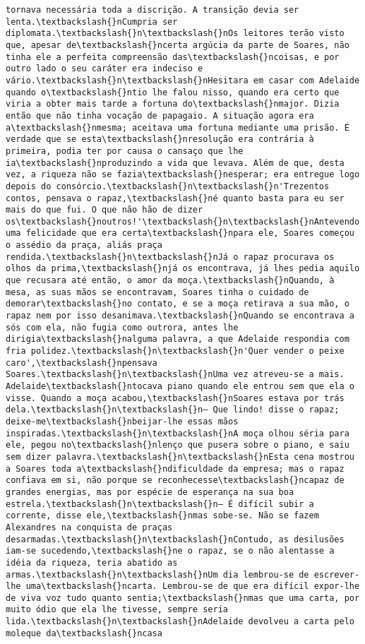 \documentclass[11pt]{article}
\begin{document}
\begin{Verbatim}[commandchars=\\\{\}]
tornava necessária toda a discrição. A transição devia ser lenta.\textbackslash{}nCumpria ser diplomata.\textbackslash{}n\textbackslash{}nOs leitores terão visto que, apesar de\textbackslash{}ncerta argúcia da parte de Soares, não tinha ele a perfeita compreensão das\textbackslash{}ncoisas, e por outro lado o seu caráter era indeciso e vário.\textbackslash{}n\textbackslash{}nHesitara em casar com Adelaide quando o\textbackslash{}ntio lhe falou nisso, quando era certo que viria a obter mais tarde a fortuna do\textbackslash{}nmajor. Dizia então que não tinha vocação de papagaio. A situação agora era a\textbackslash{}nmesma; aceitava uma fortuna mediante uma prisão. É verdade que se esta\textbackslash{}nresolução era contrária à primeira, podia ter por causa o cansaço que lhe ia\textbackslash{}nproduzindo a vida que levava. Além de que, desta vez, a riqueza não se fazia\textbackslash{}nesperar; era entregue logo depois do consórcio.\textbackslash{}n\textbackslash{}n'Trezentos contos, pensava o rapaz,\textbackslash{}né quanto basta para eu ser mais do que fui. O que não hão de dizer os\textbackslash{}noutros!'\textbackslash{}n\textbackslash{}nAntevendo uma felicidade que era certa\textbackslash{}npara ele, Soares começou o assédio da praça, aliás praça rendida.\textbackslash{}n\textbackslash{}nJá o rapaz procurava os olhos da prima,\textbackslash{}njá os encontrava, já lhes pedia aquilo que recusara até então, o amor da moça.\textbackslash{}nQuando, à mesa, as suas mãos se encontravam, Soares tinha o cuidado de demorar\textbackslash{}no contato, e se a moça retirava a sua mão, o rapaz nem por isso desanimava.\textbackslash{}nQuando se encontrava a sós com ela, não fugia como outrora, antes lhe dirigia\textbackslash{}nalguma palavra, a que Adelaide respondia com fria polidez.\textbackslash{}n\textbackslash{}n'Quer vender o peixe caro',\textbackslash{}npensava Soares.\textbackslash{}n\textbackslash{}nUma vez atreveu-se a mais. Adelaide\textbackslash{}ntocava piano quando ele entrou sem que ela o visse. Quando a moça acabou,\textbackslash{}nSoares estava por trás dela.\textbackslash{}n\textbackslash{}n— Que lindo! disse o rapaz; deixe-me\textbackslash{}nbeijar-lhe essas mãos inspiradas.\textbackslash{}n\textbackslash{}nA moça olhou séria para ele, pegou no\textbackslash{}nlenço que pusera sobre o piano, e saiu sem dizer palavra.\textbackslash{}n\textbackslash{}nEsta cena mostrou a Soares toda a\textbackslash{}ndificuldade da empresa; mas o rapaz confiava em si, não porque se reconhecesse\textbackslash{}ncapaz de grandes energias, mas por espécie de esperança na sua boa estrela.\textbackslash{}n\textbackslash{}n— É difícil subir a corrente, disse ele,\textbackslash{}nmas sobe-se. Não se fazem Alexandres na conquista de praças desarmadas.\textbackslash{}n\textbackslash{}nContudo, as desilusões iam-se sucedendo,\textbackslash{}ne o rapaz, se o não alentasse a idéia da riqueza, teria abatido as armas.\textbackslash{}n\textbackslash{}nUm dia lembrou-se de escrever-lhe uma\textbackslash{}ncarta. Lembrou-se de que era difícil expor-lhe de viva voz tudo quanto sentia;\textbackslash{}nmas que uma carta, por muito ódio que ela lhe tivesse, sempre seria lida.\textbackslash{}n\textbackslash{}nAdelaide devolveu a carta pelo moleque da\textbackslash{}ncasa 
\end{Verbatim}
\end{document}
